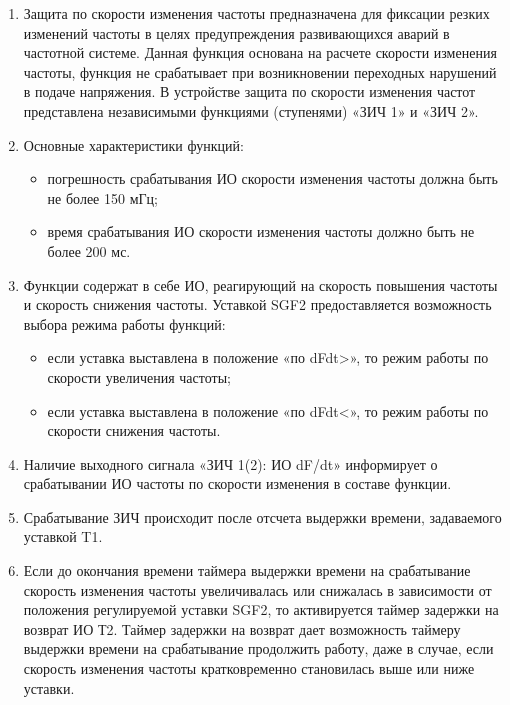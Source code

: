 
\color{black}

\begin{enumerate}

\item
Защита по скорости изменения частоты предназначена для фиксации резких изменений частоты в целях предупреждения развивающихся аварий в частотной системе. Данная функция основана на расчете скорости изменения частоты, функция не срабатывает при возникновении переходных нарушений в подаче напряжения. В устройстве защита по скорости изменения частот представлена независимыми функциями (ступенями) «ЗИЧ 1» и «ЗИЧ 2».

\item
Основные характеристики функций:
\begin{itemize}
    \item погрешность срабатывания ИО скорости изменения частоты должна быть не более 150 мГц;
    \item время срабатывания ИО скорости изменения частоты должно быть не более 200 мс.
\end{itemize}

\item
Функции содержат в себе ИО, реагирующий на скорость повышения частоты и скорость снижения частоты. Уставкой SGF2 предоставляется возможность выбора режима работы функций:
\begin{itemize}
    \item если уставка выставлена в положение «по dFdt>», то режим работы по скорости увеличения частоты;
    \item если уставка выставлена в положение «по dFdt<», то режим работы по скорости снижения частоты.
\end{itemize}

\item
Наличие выходного сигнала «ЗИЧ 1(2): ИО dF/dt» информирует о срабатывании ИО частоты по скорости изменения в составе функции.

\item
Срабатывание ЗИЧ происходит после отсчета выдержки времени, задаваемого уставкой T1.

\item
Если до окончания времени таймера выдержки времени на срабатывание скорость изменения частоты увеличивалась или снижалась в зависимости от положения регулируемой уставки SGF2, то активируется таймер задержки на возврат ИО Т2. Таймер задержки на возврат дает возможность таймеру выдержки времени на срабатывание продолжить работу, даже в случае, если скорость изменения частоты кратковременно становилась выше или ниже уставки.


\end{enumerate}
